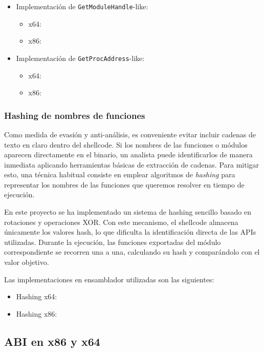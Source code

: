 \begin{itemize}
    \item Implementación de \texttt{GetModuleHandle}-like:
    \begin{itemize}
        \item x64: \cite{x64_get_module}
        \item x86: \cite{x86_get_module}
    \end{itemize}
    \item Implementación de \texttt{GetProcAddress}-like:
    \begin{itemize}
        \item x64: \cite{x64_get_proc}
        \item x86: \cite{x86_get_proc}
    \end{itemize}
\end{itemize}

\subsubsection{Hashing de nombres de funciones}

Como medida de evasión y anti-análisis, es conveniente evitar incluir cadenas de texto en claro dentro del shellcode. Si los nombres de las funciones o módulos aparecen directamente en el binario, un analista puede identificarlos de manera inmediata aplicando herramientas básicas de extracción de cadenas. Para mitigar esto, una técnica habitual consiste en emplear algoritmos de \textit{hashing} para representar los nombres de las funciones que queremos resolver en tiempo de ejecución.

En este proyecto se ha implementado un sistema de hashing sencillo basado en rotaciones y operaciones XOR. Con este mecanismo, el shellcode almacena únicamente los valores hash, lo que dificulta la identificación directa de las APIs utilizadas. Durante la ejecución, las funciones exportadas del módulo correspondiente se recorren una a una, calculando su hash y comparándolo con el valor objetivo.

Las implementaciones en ensamblador utilizadas son las siguientes:

\begin{itemize}
    \item Hashing x64: \cite{x64_hash}
    \item Hashing x86: \cite{x86_hash}
\end{itemize}

\subsection{ABI en x86 y x64}

